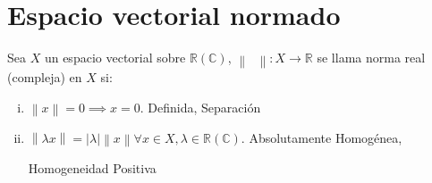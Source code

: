 %
%
%
\chapter{Espacio vectorial normado}
\label{intro} %

\begin{definition}
    Sea $X$ un espacio vectorial sobre
    \begin{math}
        \mathbb{R}
        \left(
        \mathbb{C}
        \right)
    \end{math},
    \begin{math}
        \left\|
        \phantom{\cdot}
        \right\|\colon
        X\to
        \mathbb{R}
    \end{math}
    se llama norma real (compleja) en $X$ si:
    \begin{enumerate}[i)]
        \item

              \begin{math}
                  \left\|
                  x
                  \right\|=
                  0\implies
                  x=
                  0
              \end{math}.
              \hfill
              Definida, Separación

        \item

              \begin{math}
                  \left\|
                  \lambda x
                  \right\|=
                  \left|
                  \lambda
                  \right|
                  \left\|
                  x
                  \right\|
                  \forall x\in X,
                  \lambda\in\mathbb{R}
                  \left(\mathbb{C}\right)
              \end{math}.
              \hfill
              Absolutamente Homogénea,

              \hfill
              Homogeneidad Positiva


\end{enumerate}
\end{definition}
